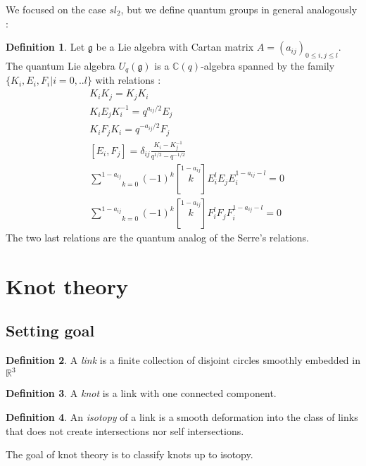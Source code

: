 \documentclass{article}
\theoremstyle{definition}
\newtheorem{Def}{Definition}[section]
\begin{document}
We focused on the case $sl_2$, but we define quantum groups in general analogously : \begin{Def} Let $\mathfrak{g}$ be a Lie algebra with Cartan matrix $A=(a_{ij})_{0\leqslant i,j\leqslant l}$. The quantum Lie algebra $U_q(\mathfrak{g})$ is a $\mathbb{C}(q)$-algebra spanned by the family $\{K_i,E_i,F_i\vert i=0,..l\}$ with relations : 
\begin{align*}
&K_iK_j=K_jK_i\\
&K_iE_jK_i^{-1}=q^{a_{ij}/2}E_j\\
&K_iF_jK_i=q^{-a_{ij}/2}F_j\\
&[E_i,F_j]=\delta_{ij}\frac{K_i-K_j^{-1}}{q^{1/2}-q^{-1/2}}\\
&\underset{k=0}{\overset{1-a_{ij}}\sum}(-1)^{k}\left[\overset{1-a_{ij}}{k}\right] E_i^lE_jE_i^{1-a_{ij}-l}=0\\
&\underset{k=0}{\overset{1-a_{ij}}\sum}(-1)^{k}\left[\overset{1-a_{ij}}{k}\right] F_i^lF_jF_i^{1-a_{ij}-l}=0
\end{align*}
The two last relations are the quantum analog of the Serre's relations.
\end{Def}
\section{Knot theory}

\subsection{Setting goal}
\begin{Def} A \textit{link} is a finite collection of disjoint circles smoothly embedded in $\mathbb{R}^3$
\end{Def}
\begin{Def}
A \textit{knot} is a link with one connected component.
\end{Def}
\begin{Def} An \textit{isotopy} of a link is a smooth deformation into the class of links that does not create intersections nor self intersections.
\end{Def}
The goal of knot theory is to classify knots up to isotopy.
\end{document}
